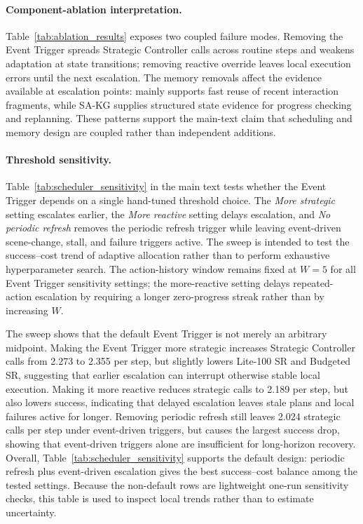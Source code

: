 \paragraph{Component-ablation interpretation.}
\label{sec:appendix_component_ablation_interpretation}
Table~\mbox{\ref{tab:ablation_results}} exposes two coupled failure modes.
Removing the Event Trigger spreads Strategic Controller calls across routine steps
and weakens adaptation at state transitions; removing reactive override leaves
local execution errors until the next escalation. The memory removals affect the
evidence available at escalation points: \samb{} mainly supports fast reuse of
recent interaction fragments, while SA-KG supplies structured state evidence for
progress checking and replanning. These patterns support the main-text claim
that scheduling and memory design are coupled rather than independent additions.

\paragraph{Threshold sensitivity.}
\label{sec:appendix_threshold_sensitivity}
Table~\mbox{\ref{tab:scheduler_sensitivity}} in the main text tests whether the
Event Trigger depends on a single hand-tuned threshold choice. The \emph{More
strategic} setting escalates earlier, the \emph{More reactive} setting delays
escalation, and \emph{No periodic refresh} removes the periodic refresh trigger
while leaving event-driven scene-change, stall, and failure triggers active. The
sweep is intended to test the success--cost trend of adaptive allocation rather
than to perform exhaustive hyperparameter search.
The action-history window remains fixed at $W=5$ for all Event Trigger sensitivity
settings; the more-reactive setting delays repeated-action escalation by
requiring a longer zero-progress streak rather than by increasing $W$.

The sweep shows that the default Event Trigger is not merely an arbitrary midpoint.
Making the Event Trigger more strategic increases Strategic Controller calls from
2.273 to 2.355 per step, but slightly lowers Lite-100 SR and Budgeted SR,
suggesting that earlier escalation can interrupt otherwise stable local
execution. Making it more reactive reduces strategic calls to 2.189 per step,
but also lowers success, indicating that delayed escalation leaves stale plans
and local failures active for longer. Removing periodic refresh still leaves
2.024 strategic calls per step under event-driven triggers, but causes the
largest success drop, showing that event-driven triggers alone are insufficient
for long-horizon recovery. Overall, Table~\mbox{\ref{tab:scheduler_sensitivity}}
supports the default design: periodic refresh plus event-driven escalation gives
the best success--cost balance among the tested settings.
Because the non-default rows are lightweight one-run sensitivity checks, this
table is used to inspect local trends rather than to estimate uncertainty.

